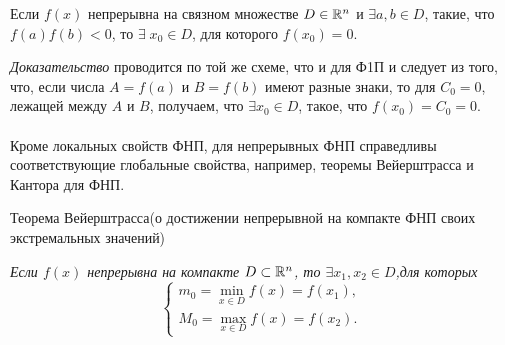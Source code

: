 \begin{consequence}
	Если $f(x)$ непрерывна на связном множестве $D \in \mathbb{R}^{n}$ и $\exists a, b \in D$, такие, что
	$f(a)f(b) < 0$, то $\exists \; x_0 \in D$, для которого $f(x_0) = 0$.
\end{consequence}

\textit{Доказательство}
	проводится по той же схеме, что и для Ф1П и следует из того, что, если числа $A = f(a)$ и $B = f(b)$
	имеют разные знаки, то для $C_0 = 0$, лежащей между $A$ и $B$, получаем, что $\exists x_0 \in D$,
	такое, что $f(x_0) = C_0 = 0$.\\\\

Кроме локальных свойств ФНП, для непрерывных ФНП справедливы соответствующие глобальные свойства,
например, теоремы Вейерштрасса и Кантора для ФНП.

\begin{statementUncoloned}{Теорема Вейерштрасса}(о достижении непрерывной на компакте ФНП своих экстремальных значений)
    
    \textit{Если $f(x)$ непрерывна на компакте $D \subset \mathbb{R}^{n}$, то $\exists x_1, x_2 \in D$,для которых}
    \begin{equation}
        \label{eq:2-vejershtrass-theorem}
        \begin{cases}
            m_0 = \min\limits_{x \in D} f(x) = f(x_1),\\
            M_0 = \max\limits_{x \in D} f(x) = f(x_2).
            \end{cases}
    \end{equation}
\end{statementUncoloned} 

